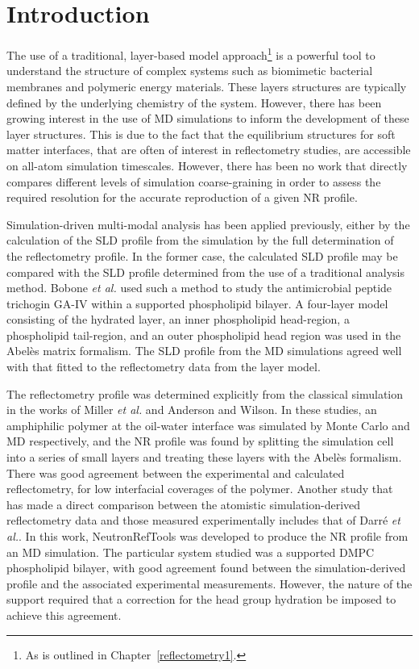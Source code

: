 \section{Introduction}
The use of a traditional, layer-based model approach\footnote{As is outlined in Chapter~\ref{reflectometry1}.} is a powerful tool to understand the structure of complex systems such as biomimetic bacterial membranes and polymeric energy materials.
These layers structures are typically defined by the underlying chemistry of the system.
However, there has been growing interest in the use of MD simulations to inform the development of these layer structures.
This is due to the fact that the equilibrium structures for soft matter interfaces, that are often of interest in reflectometry studies, are accessible on all-atom simulation timescales.
However, there has been no work that directly compares different levels of simulation coarse-graining in order to assess the required resolution for the accurate reproduction of a given NR profile.

Simulation-driven multi-modal analysis has been applied previously, either by the calculation of the SLD profile from the simulation by the full determination of the reflectometry profile.
In the former case, the calculated SLD profile may be compared with the SLD profile determined from the use of a traditional analysis method.
Bobone \emph{et al.} used such a method to study the antimicrobial peptide trichogin GA-IV within a supported phospholipid bilayer.
A four-layer model consisting of the hydrated  layer, an inner phospholipid head-region, a phospholipid tail-region, and an outer phospholipid head region was used in the Abel\`{e}s matrix formalism.
The SLD profile from the MD simulations agreed well with that fitted to the reflectometry data from the layer model.

The reflectometry profile was determined explicitly from the classical simulation in the works of Miller \emph{et al.} and Anderson and Wilson.
In these studies, an amphiphilic polymer at the oil-water interface was simulated by Monte Carlo and MD respectively, and the NR profile was found by splitting the simulation cell into a series of small layers and treating these layers with the Abel\`{e}s formalism.
There was good agreement between the experimental and calculated reflectometry, for low interfacial coverages of the polymer.
Another study that has made a direct comparison between the atomistic simulation-derived reflectometry data and those measured experimentally includes that of Darr\'{e} \emph{et al.}.
In this work, NeutronRefTools was developed to produce the NR profile from an MD simulation.
The particular system studied was a supported DMPC phospholipid bilayer, with good agreement found between the simulation-derived profile and the associated experimental measurements.
However, the nature of the support required that a correction for the head group hydration be imposed to achieve this agreement.

